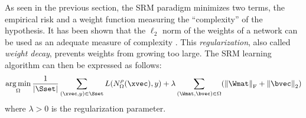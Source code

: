 As seen in the previous section, the SRM paradigm minimizes two terms, the empirical risk and a weight function measuring the ``complexity'' of the hypothesis.
It has been shown that the $\ell_2$ norm of the weights of a network can be used as an adequate measure of complexity \cite{hinton1987learning}.
This \emph{regularization}, also called \emph{weight decay}, prevents weights from growing too large.
The SRM learning algorithm can then be expressed as follows:
\begin{equation}
  \argmin_{\weights} \frac{1}{|\Sset|} \sum_{(\xvec, y) \in \Sset} L(N^\act_\weights(\xvec), y) + \lambda \sum_{(\Wmat, \bvec) \in \weights} \left( \norm{\Wmat}_\mathrm{F} + \norm{\bvec}_\mathrm{2} \right)
\end{equation}
where $\lambda > 0$ is the regularization parameter.


